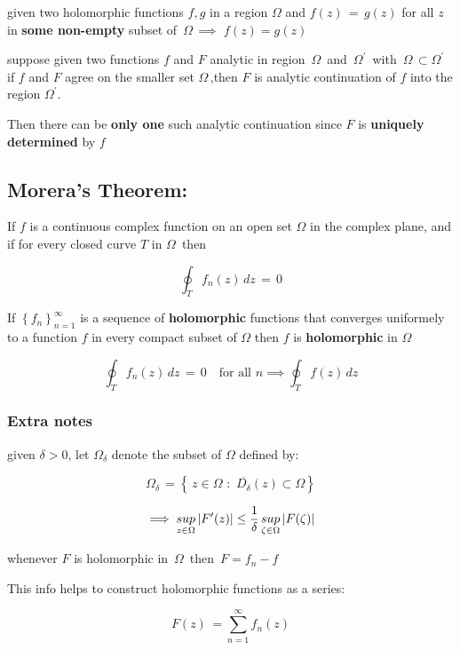 \documentclass[11pt]{article}
\begin{document}
given two holomorphic functions \(f,g\) in a region \(\Omega\) and
\(f(z)\,=\,g(z)\) for all \(z\) in \textbf{some non-empty} subset of
\(\,\Omega\,\implies\) \(f(z)=g(z)\)

suppose given two functions \(f\) and \(F\) analytic in region
\(\,\Omega\,\) and \(\,\Omega^{\prime}\,\) with
\(\,\Omega\,\subset\Omega^{\prime}\,\,\) if \(f\) and \(F\) agree on the
smaller set \(\Omega\,\),then \(F\) is analytic continuation of \(f\)
into the region \(\Omega^{\prime}\).

Then there can be \textbf{only one} such analytic continuation since
\(F\) is \textbf{uniquely determined} by \(f\)

    \subsection{Morera's Theorem:}\label{moreras-theorem}

If \(f\) is a continuous complex function on an open set \(\Omega\) in
the complex plane, and if for every closed curve \(T\) in \(\Omega\,\)
then

\[\oint_{T}{f_{n}(z)\,dz\,=\,0}\]

If \(\left\{f_{n}\right\}_{n=1}^{\infty}\) is a sequence of
\textbf{holomorphic} functions that converges uniformely to a function
\(f\) in every compact subset of \(\Omega\) then \(f\) is
\textbf{holomorphic} in \(\Omega\)

\[\oint_{T}{f_{n}(z)\,dz\,=\,0}\quad\text{for all}\,\,n \implies \oint_{T}{f(z)\,dz}\]

    \subsubsection{Extra notes}\label{extra-notes}

given \(\delta>0\), let \(\Omega_{\delta}\) denote the subset of
\(\Omega\) defined by:

\[\Omega_{\delta}\,=\left\{\,z\in\Omega\,\,:\,\,\overline{D_{\delta}}(z) \subset \Omega\right\}\]

\[\implies \large{\underset{z \in \Omega}{sup}} \left|F^{\prime}(z)\right|\le \frac{1}{\delta}\,\large{\underset{\zeta \in \Omega}{sup}} \left|F(\zeta)\right|\]

whenever \(F\) is holomorphic in \(\,\Omega\,\) then \(\,F=f_{n}-f\)

This info helps to construct holomorphic functions as a series:

\[F(z)\,=\sum_{n=1}^{\infty}{f_{n}(z)}\]
\end{document}
